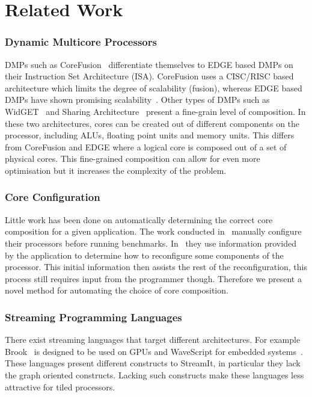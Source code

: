 \chapter{Related Work}

\subsection{Dynamic Multicore Processors}

DMPs such as CoreFusion~\cite{ipek2007CoreFusion} differentiate themselves to EDGE based DMPs on their Instruction Set Architecture (ISA).
CoreFusion uses a CISC/RISC based architecture which limits the degree of scalability (fusion), whereas EDGE based DMPs have shown promising scalability~\cite{kim2007composablelight, sibi2014}.
Other types of DMPs such as WidGET~\cite{Watanabe2010Widget} and Sharing Architecture~\cite{zhou2014sharingarch} present a fine-grain level of composition.
In these two architectures, cores can be created out of different components on the processor, including ALUs, floating point units and memory units.
This differs from CoreFusion and EDGE where a logical core is composed out of a set of physical cores.
This fine-grained composition can allow for even more optimisation but it increases the complexity of the problem.

\subsection{Core Configuration}

Little work has been done on automatically determining the correct core composition for a given application.
The work conducted in~\cite{ipek2007CoreFusion,kim2007composablelight} manually configure their processors before running benchmarks.
In~\cite{santos2013nocdmc} they use information provided by the application to determine how to reconfigure some components of the processor.
This initial information then assists the rest of the reconfiguration, this process still requires input from the programmer though.
Therefore we present a novel method for automating the choice of core composition.  

\subsection{Streaming Programming Languages}

There exist streaming languages that target different architectures.
For example Brook~\cite{buck2004brook} is designed to be used on GPUs and WaveScript for embedded systems~\cite{newton2008wavescript}.
These languages present different constructs to StreamIt, in particular they lack the graph oriented constructs. 
Lacking such constructs make these languages less attractive for tiled processors.

